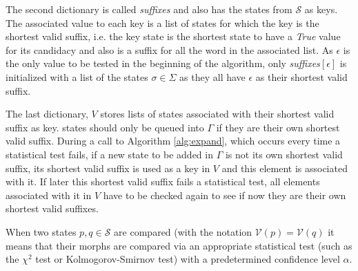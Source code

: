 { The second dictionary is called \textit{suffixes} and also has the states from $\mathcal{S}$ as keys. The associated value to each key is a list of states for which the key is the shortest valid suffix, i.e. the key state is the shortest state to have a \textit{True} value for its candidacy and also is a suffix for all the word in the associated list. As $\epsilon$ is the only value to be tested in the beginning of the algorithm, only \textit{suffixes}$[\epsilon]$ is initialized with a list of the states  $\sigma \in \Sigma$ as they all have $\epsilon$ as their shortest valid suffix.
 
 The last dictionary, $V$ stores lists of states associated with their shortest valid suffix as key. states should only be queued into $\Gamma$ if they are their own shortest valid suffix. During a call to Algorithm \ref{alg:expand}, which occurs every time a statistical test fails, if a new state to be added in $\Gamma$ is not its own shortest valid suffix, its shortest valid suffix is used as a key in $V$ and this element is associated with it. If later this shortest valid suffix fails a statistical test, all elements associated with it in $V$ have to be checked again to see if now they are their own shortest valid suffixes.
 
When two states $p, q \in \mathcal{S}$ are compared (with the notation $\mathcal{V}(p) = \mathcal{V}(q)$ it means that their morphs are compared via an appropriate statistical test (such as the $\chi^2$ test or Kolmogorov-Smirnov test) with a predetermined confidence level $\alpha$.
 
}
